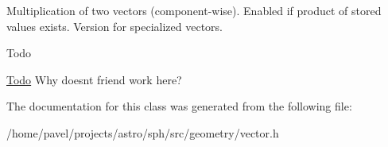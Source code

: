 Multiplication of two vectors (component-\/wise). Enabled if product of stored values exists. Version for specialized vectors. \begin{DoxyRefDesc}{Todo}
\item[\hyperlink{todo__todo000013}{Todo}]Why doesn\textquotesingle{}t \textquotesingle{}friend\textquotesingle{} work here? \end{DoxyRefDesc}


The documentation for this class was generated from the following file\+:\begin{DoxyCompactItemize}
\item 
/home/pavel/projects/astro/sph/src/geometry/vector.\+h\end{DoxyCompactItemize}
